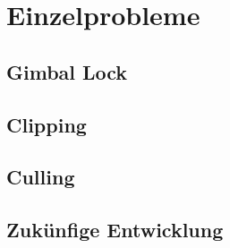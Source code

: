 \chapter{Einzelprobleme}

\section{Gimbal Lock}

\section{Clipping}

\section{Culling}

\section{Zukünfige Entwicklung}